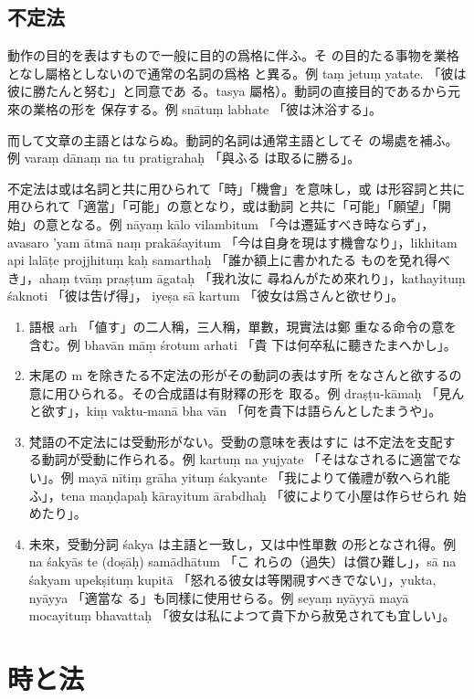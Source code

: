 \subsection{不定法}
\numberParagraph
動作の目的を表はすもので一般に目的の爲格に伴ふ。そ
の目的たる事物を業格となし屬格としないので通常の名詞の爲格
と異る。例 taṃ jetuṃ yatate. 「彼は彼に勝たんと努む」と同意であ
る。tasya 屬格）。動詞の直接目的であるから元來の業格の形を
保存する。例 snātuṃ labhate 「彼は沐浴する」。

而して文章の主語とはならぬ。動詞的名詞は通常主語としてそ
の場處を補ふ。例 varaṃ dānaṃ na tu pratigrahaḥ 「與ふる
は取るに勝る」。

不定法は或は名詞と共に用ひられて「時」「機會」を意味し，或
は形容詞と共に用ひられて「適當」「可能」の意となり，或は動詞
と共に「可能」「願望」「開始」の意となる。例 nāyaṃ kālo
vilambitum 「今は遷延すべき時ならず」，avasaro 'yam ātmā\-%
naṃ prakāśayitum 「今は自身を現はす機會なり」，likhitam
api lalāṭe projjhituṃ kaḥ samarthaḥ 「誰か額上に書かれたる
ものを免れ得べき」，ahaṃ tvāṃ praṣṭum āgataḥ 「我れ汝に
尋ねんがため來れり」，kathayituṃ śaknoti 「彼は吿げ得」，
iyeṣa sā kartum 「彼女は爲さんと欲せり」。

\begin{enumerate}[label=(\alph*)]
\item 語根 arh 「値す」の二人稱，三人稱，單數，現實法は鄭
重なる命令の意を含む。例 bhavān māṃ śrotum arhati 「貴
下は何卒私に聽きたまへかし」。
\item 末尾の m を除きたる不定法の形がその動詞の表はす所
をなさんと欲するの意に用ひられる。その合成語は有財釋の形を
取る。例 draṣṭu-kāmaḥ 「見んと欲す」，kiṃ vaktu-manā bha\-%
vān 「何を貴下は語らんとしたまうや」。
\item 梵語の不定法には受動形がない。受動の意味を表はすに
は不定法を支配する動詞が受動に作られる。例 kartuṃ na
yujyate 「そはなされるに適當でない」。例 mayā nītiṃ grāha\-%
yituṃ śakyante 「我によりて儀禮が敎へられ能ふ」，tena
maṇḍapaḥ kārayitum ārabdhaḥ 「彼によりて小屋は作らせられ
始めたり」。
\item 未來，受動分詞 śakya は主語と一致し，又は中性單數
の形となされ得。例 na śakyās te (doṣāḥ) samādhātum 「こ
れらの（過失）は償ひ難し」，sā na śakyam upekṣituṃ kupitā
「怒れる彼女は等閑視すべきでない」，yukta, nyāyya 「適當な
る」も同樣に使用せらる。例 seyaṃ nyāyyā mayā mocayituṃ
bhavattaḥ 「彼女は私によつて貴下から赦免されても宜しい」。
\end{enumerate}

\section{時と法}
